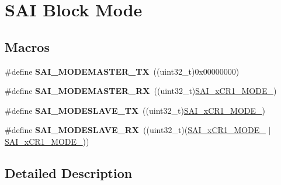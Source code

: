 \hypertarget{group___s_a_i___block___mode}{}\section{S\+AI Block Mode}
\label{group___s_a_i___block___mode}
\subsection*{Macros}
\begin{DoxyCompactItemize}
\item 
\#define {\bfseries S\+A\+I\+\_\+\+M\+O\+D\+E\+M\+A\+S\+T\+E\+R\+\_\+\+TX}~((uint32\+\_\+t)0x00000000)\hypertarget{group___s_a_i___block___mode_gaeea4548253bc7f78f812160c1a4b717c}{}\label{group___s_a_i___block___mode_gaeea4548253bc7f78f812160c1a4b717c}

\item 
\#define {\bfseries S\+A\+I\+\_\+\+M\+O\+D\+E\+M\+A\+S\+T\+E\+R\+\_\+\+RX}~((uint32\+\_\+t)\hyperlink{group___peripheral___registers___bits___definition_ga24269e60d3836bf6524a8e56b2f8bba1}{S\+A\+I\+\_\+x\+C\+R1\+\_\+\+M\+O\+D\+E\+\_})\hypertarget{group___s_a_i___block___mode_gacc964c4eabb4eb5d530c72c12d67d365}{}\label{group___s_a_i___block___mode_gacc964c4eabb4eb5d530c72c12d67d365}

\item 
\#define {\bfseries S\+A\+I\+\_\+\+M\+O\+D\+E\+S\+L\+A\+V\+E\+\_\+\+TX}~((uint32\+\_\+t)\hyperlink{group___peripheral___registers___bits___definition_ga4c25169081899de44a05e793e46d7ca5}{S\+A\+I\+\_\+x\+C\+R1\+\_\+\+M\+O\+D\+E\+\_})\hypertarget{group___s_a_i___block___mode_ga03c270c2f75128cf5305c392f3f8c254}{}\label{group___s_a_i___block___mode_ga03c270c2f75128cf5305c392f3f8c254}

\item 
\#define {\bfseries S\+A\+I\+\_\+\+M\+O\+D\+E\+S\+L\+A\+V\+E\+\_\+\+RX}~((uint32\+\_\+t)(\hyperlink{group___peripheral___registers___bits___definition_ga4c25169081899de44a05e793e46d7ca5}{S\+A\+I\+\_\+x\+C\+R1\+\_\+\+M\+O\+D\+E\+\_} $\vert$ \hyperlink{group___peripheral___registers___bits___definition_ga24269e60d3836bf6524a8e56b2f8bba1}{S\+A\+I\+\_\+x\+C\+R1\+\_\+\+M\+O\+D\+E\+\_}))\hypertarget{group___s_a_i___block___mode_gad7121d513fde6926847c0b4e9da15be0}{}\label{group___s_a_i___block___mode_gad7121d513fde6926847c0b4e9da15be0}

\end{DoxyCompactItemize}


\subsection{Detailed Description}
